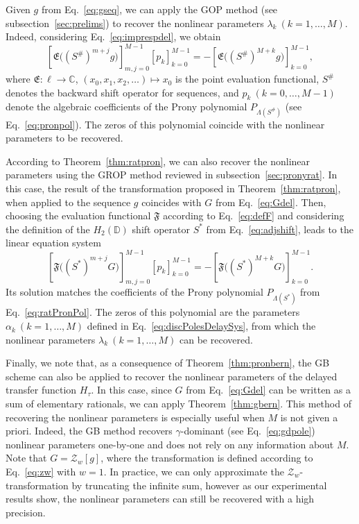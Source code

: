 \documentclass{arxiv}
\newcommand{\funF}{\mathfrak{F}}
\newcommand{\funE}{\mathfrak{E}}
\begin{document}
Given $g$ from Eq.~\eqref{eq:gseq}, we can apply the GOP method (see subsection~\ref{sec:prelims}) to recover the nonlinear parameters $\lambda_k \ (k=1,\ldots,M)$. Indeed, considering  Eq.~\eqref{eq:imprespdel}, we obtain
\begin{equation*}
    \left[ \funE\big(( S^{\#})^{m+j} g\big) \right]_{m, j=0}^{M-1} \left[ p_k \right]_{k=0}^{M-1} = -\left[ \funE\big(( S^{\#})^{M + k} g\big)\right]_{k=0}^{M-1},
\end{equation*}
where $\funE : \ell \to \mathbb{C}$, $(x_0,x_1,x_2,\ldots) \mapsto x_0$ is the point evaluation functional, $S^{\#}$ denotes the backward shift operator for sequences, and $p_k \ (k=0,\ldots,M-1)$ denote the algebraic coefficients of the Prony polynomial $P_{\Lambda(S^{\#})}$ (see Eq.~\eqref{eq:pronpol}). The zeros of this polynomial coincide with the nonlinear parameters to be recovered. 

According to Theorem~\ref{thm:ratpron}, we can also recover the nonlinear parameters using the GROP method reviewed in subsection~\ref{sec:pronyrat}. In this case, the result of the transformation proposed in Theorem~\ref{thm:ratpron}, when applied to the sequence $g$ coincides with $G$ from Eq.~\eqref{eq:Gdel}. Then, choosing the evaluation functional $\funF$ according to Eq.~\eqref{eq:defF} and considering the definition of the $H_2(\mathbb{D})$ shift operator $S^{\ast}$ from Eq.~\eqref{eq:adjshift}, leads to the linear equation system
\begin{equation*}
    \left[ \funF\big(( S^{\ast})^{m+j} G\big) \right]_{m, j=0}^{M-1} \left[ p_k \right]_{k=0}^{M-1} = -\left[ \funF\big(( S^{\ast})^{M + k} G\big)\right]_{k=0}^{M-1}.
\end{equation*}
Its solution  matches the coefficients of the Prony polynomial $P_{\Lambda(S^{\ast})}$ from Eq.~\eqref{eq:ratPronPol}. The zeros of this polynomial are the parameters $\alpha_k \ (k=1,\ldots,M)$ defined in Eq.~\eqref{eq:discPolesDelaySys}, from which the nonlinear parameters $\lambda_k \ (k=1,\ldots,M)$ can be recovered.

Finally, we note that, as a consequence of Theorem~\ref{thm:pronbern}, the GB scheme can also be applied to recover the nonlinear parameters of the delayed transfer function $H_{\tau}$. In this case, since $G$ from Eq.~\eqref{eq:Gdel} can be written as a sum of elementary rationals, we can apply Theorem~\ref{thm:gbern}. This method of recovering the nonlinear parameters is especially useful when $M$ is not given a priori. Indeed, the GB method recovers $\gamma$-dominant (see Eq.~\eqref{eq:gdpole}) nonlinear parameters one-by-one and does not rely on any information about $M$. Note that $G = \mathcal{Z}_{w}[g]$, where the transformation is defined according to Eq.~\eqref{eq:zw} with $w=1$. In practice, we can only approximate the $\mathcal{Z}_w$-transformation by truncating the infinite sum, however as our experimental results show, the nonlinear parameters can still be recovered with a high precision. 
\end{document}
